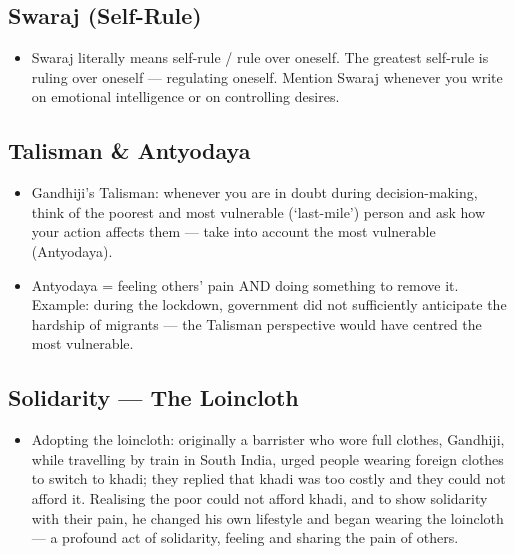 \subsection{Swaraj (Self-Rule)}

\begin{itemize}
\item Swaraj literally means self-rule / rule over oneself. The greatest self-rule is ruling over oneself --- regulating oneself. Mention Swaraj whenever you write on emotional intelligence or on controlling desires.
\end{itemize}

\subsection{Talisman \& Antyodaya}

\begin{KeyConcept}
\begin{itemize}
\item Gandhiji's Talisman: whenever you are in doubt during decision-making, think of the poorest and most vulnerable (`last-mile') person and ask how your action affects them --- take into account the most vulnerable (Antyodaya).
\item Antyodaya = feeling others' pain AND doing something to remove it. Example: during the lockdown, government did not sufficiently anticipate the hardship of migrants --- the Talisman perspective would have centred the most vulnerable.
\end{itemize}
\end{KeyConcept}

\subsection{Solidarity --- The Loincloth}

\begin{itemize}
\item Adopting the loincloth: originally a barrister who wore full clothes, Gandhiji, while travelling by train in South India, urged people wearing foreign clothes to switch to khadi; they replied that khadi was too costly and they could not afford it. Realising the poor could not afford khadi, and to show solidarity with their pain, he changed his own lifestyle and began wearing the loincloth --- a profound act of solidarity, feeling and sharing the pain of others.
\end{itemize}

